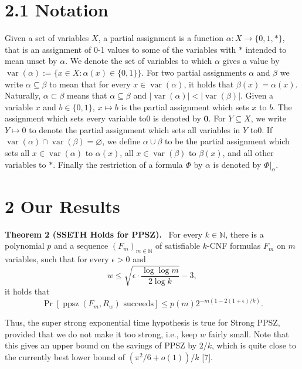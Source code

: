 \documentclass[10pt,a4paper]{article}
\newenvironment{authorclaim}[1]{\par\medskip\noindent\textbf{#1.}\ \ignorespaces}{\par\medskip}
\begin{document}
\section*{2.1 Notation}
Given a set of variables $X$, a partial assignment is a function $\alpha:X\to\{0,1,*\}$, that is an assignment of 0-1 values to some of the variables with $*$ intended to mean unset by $\alpha$. We denote the set of variables to which $\alpha$ gives a value by $\operatorname{var}(\alpha):=\{x\in X:\alpha(x)\in\{0,1\}\}$. For two partial assignments $\alpha$ and $\beta$ we write $\alpha\subseteq\beta$ to mean that for every $x\in\operatorname{var}(\alpha)$, it holds that $\beta(x)=\alpha(x)$. Naturally, $\alpha\subset\beta$ means that $\alpha\subseteq\beta$ and $|\operatorname{var}(\alpha)|<|\operatorname{var}(\beta)|$. Given a variable $x$ and $b\in\{0,1\}$, $x\mapsto b$ is the partial assignment which sets $x$ to $b$. The assignment which sets every variable to0 is denoted by $\mathbf0$. For $Y\subseteq X$, we write $Y\mapsto0$ to denote the partial assignment which sets all variables in $Y$ to0. If $\operatorname{var}(\alpha)\cap\operatorname{var}(\beta)=\varnothing$, we define $\alpha\cup\beta$ to be the partial assignment which sets all $x\in\operatorname{var}(\alpha)$ to $\alpha(x)$, all $x\in\operatorname{var}(\beta)$ to $\beta(x)$, and all other variables to $*$. Finally the restriction of a formula $\Phi$ by $\alpha$ is denoted by $\Phi|_\alpha$.

\section*{2 Our Results}
\begin{authorclaim}{Theorem 2 (SSETH Holds for PPSZ)}
For every $k\in\mathbb N$, there is a polynomial $p$ and a sequence $(F_m)_{m\in\mathbb N}$ of satisfiable $k$-CNF formulas $F_m$ on $m$ variables, such that for every $\epsilon>0$ and
\[
w\le\sqrt{\epsilon\cdot\frac{\log\log m}{2\log k}}-3,
\]
it holds that
\[
\Pr[\operatorname{ppsz}(F_m,R_w)\text{ succeeds}]
\le p(m)2^{-m(1-2(1+\epsilon)/k)}.
\]
\end{authorclaim}
Thus, the super strong exponential time hypothesis is true for Strong PPSZ, provided that we do not make it too strong, i.e., keep $w$ fairly small. Note that this gives an upper bound on the savings of PPSZ by $2/k$, which is quite close to the currently best lower bound of $(\pi^2/6+o(1))/k$ [7].
\end{document}
